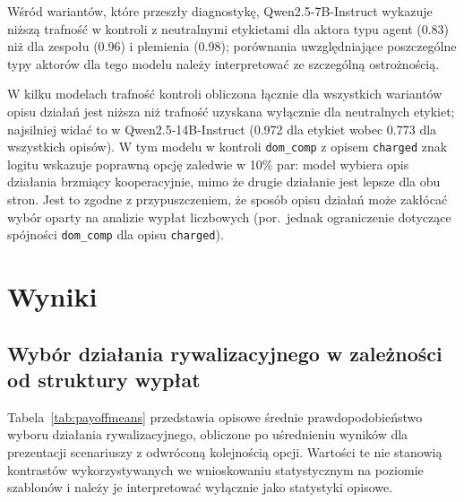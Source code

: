 \documentclass[11pt]{article}
\begin{document}
Wśród wariantów, które przeszły diagnostykę, Qwen2.5-7B-Instruct wykazuje niższą trafność w kontroli z neutralnymi etykietami dla aktora typu agent (0.83) niż dla zespołu (0.96) i plemienia (0.98); porównania uwzględniające poszczególne typy aktorów dla tego modelu należy interpretować ze szczególną ostrożnością.

W kilku modelach trafność kontroli obliczona łącznie dla wszystkich wariantów opisu działań jest niższa niż trafność uzyskana wyłącznie dla neutralnych etykiet; najsilniej widać to w Qwen2.5-14B-Instruct (0.972 dla etykiet wobec 0.773 dla wszystkich opisów). W tym modelu w kontroli \texttt{dom\_comp} z opisem \texttt{charged} znak logitu wskazuje poprawną opcję zaledwie w 10\% par: model wybiera opis działania brzmiący kooperacyjnie, mimo że drugie działanie jest lepsze dla obu stron. Jest to zgodne z przypuszczeniem, że sposób opisu działań może zakłócać wybór oparty na analizie wypłat liczbowych (por.\ jednak ograniczenie dotyczące spójności \texttt{dom\_comp} dla opisu \texttt{charged}).

\section{Wyniki}
\subsection{Wybór działania rywalizacyjnego w zależności od struktury wypłat}
Tabela~\ref{tab:payoffmeans} przedstawia opisowe średnie prawdopodobieństwo wyboru działania rywalizacyjnego, obliczone po uśrednieniu wyników dla prezentacji scenariuszy z odwróconą kolejnością opcji. Wartości te nie stanowią kontrastów wykorzystywanych we wnioskowaniu statystycznym na poziomie szablonów i należy je interpretować wyłącznie jako statystyki opisowe.
\end{document}
